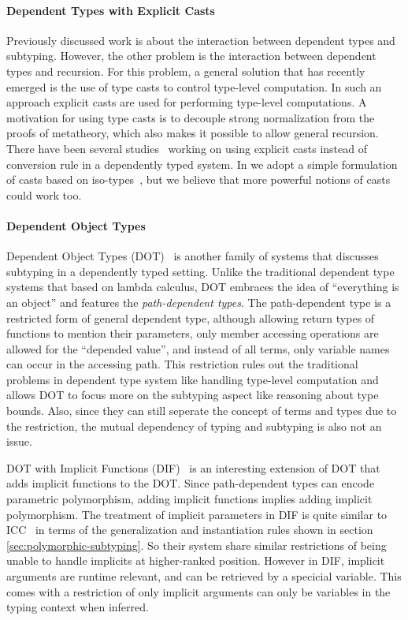 \paragraph{Dependent Types with Explicit Casts} Previously
discussed work is about the interaction between dependent types and
subtyping. However, the other problem is the
interaction between dependent types and recursion. For this
problem, a general solution that has recently emerged is the use
of type casts to control type-level computation. In such an approach explicit casts
are used for performing type-level computations. A motivation for
using type casts is to decouple strong normalization from the
proofs of metatheory, which also makes it possible to allow general
recursion. There have been several studies~\citep{guru,sjoberg:msfp12,
  kimmel:plpv, zombie:popl15, fc:kind, Doorn:2013hq,isotype} working
on using explicit casts instead of conversion rule in a dependently
typed system. In \name we adopt a simple formulation of casts based
on iso-types~\citep{isotype}, but we believe that more powerful notions
of casts could work too.

\paragraph{Dependent Object Types}

Dependent Object Types (DOT)~\citep{dot:dot,dot:path,dot:sound} is another
family of systems that discusses subtyping in a dependently typed setting.
Unlike the traditional dependent type systems that based on lambda calculus, DOT
embraces the idea of ``everything is an object'' and features the \emph{path-dependent types}.
The path-dependent type is a restricted form of general dependent type,
although allowing return types of functions
to mention their parameters, only member accessing operations are allowed for the ``depended value'',
and instead of all terms, only variable names can occur in the accessing path.
This restriction rules out the traditional problems in dependent type system
like handling type-level computation and allows DOT to focus more on the subtyping
aspect like reasoning about type bounds. Also, since they can still seperate the
concept of terms and types due to the restriction, the mutual dependency of
typing and subtyping is also not an issue.

DOT with Implicit Functions (DIF)~\citep{dif} is an interesting extension of DOT
that adds implicit functions to the DOT.
Since path-dependent types can encode parametric
polymorphism, adding implicit functions implies adding implicit polymorphism.
The treatment of implicit parameters in DIF is quite similar
to ICC~\citep{miquel2001implicit} in terms of the generalization and
instantiation rules shown in section \ref{sec:polymorphic-subtyping}.
So their system share similar restrictions of being unable to handle implicits
at higher-ranked position. However in DIF, implicit arguments are runtime relevant,
and can be retrieved by a specicial variable. This comes with a restriction of
only implicit arguments can only be variables in the typing context when inferred.

